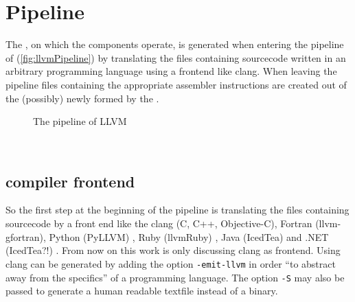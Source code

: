 \section{Pipeline}
The \llvmir, on which the components operate, is generated when entering the pipeline of \llvm (\autoref{fig:llvmPipeline}) by translating the files containing sourcecode written in an arbitrary programming language using a frontend like clang.
When leaving the pipeline files containing the appropriate assembler instructions are created out of the (possibly) newly formed \llvmir by the \generator. \cite{IntroLLVM}
\begin{figure}[!ht]
    \caption{The pipeline of LLVM}
    \label{fig:llvmPipeline}
    \centering
    \legend
\end{figure}\\
\subsection{compiler frontend}\label{subsec:compilerfrontend}
So the first step at the beginning of the pipeline is translating the files containing sourcecode by a front end like the clang (C, C++, Objective-C), Fortran (llvm-gfortran), Python (PyLLVM) , Ruby (llvmRuby) , Java (IcedTea) and .NET (IcedTea?!) .
From now on this work is only discussing clang as frontend. 
Using clang \llvmir can be generated by adding the option \texttt{-emit-llvm} in order \enquote{to abstract away from the specifics} \cite{FastScopDetection} of a programming language.
The option \texttt{-S} may also be passed to generate a human readable textfile instead of a \llvmir binary.
